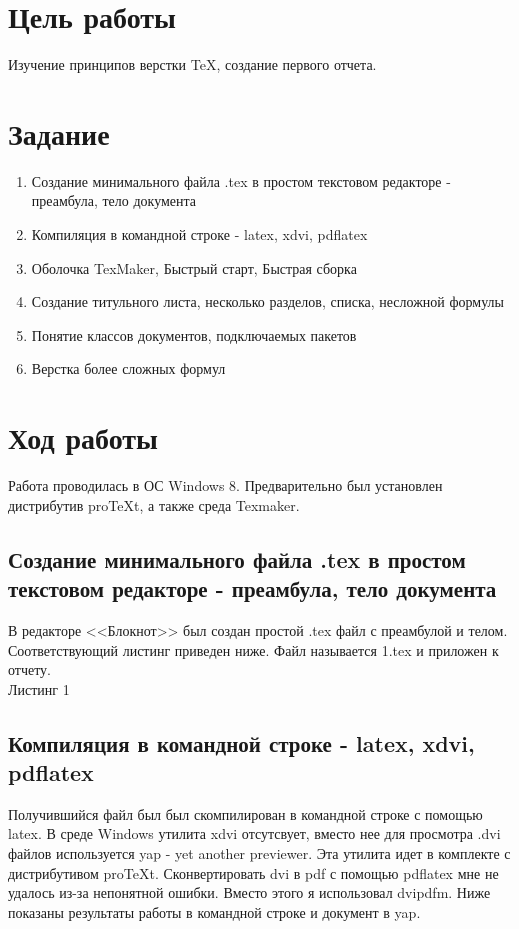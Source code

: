 \documentclass[10pt,a4paper,titlepage]{article}
\begin{document}
\section{Цель работы}
Изучение принципов верстки \TeX, создание первого отчета.

\section{Задание}
\begin{enumerate}
\item Создание минимального файла .tex в простом текстовом редакторе - преамбула, тело документа
\item Компиляция в командной строке - latex, xdvi, pdflatex
\item Оболочка TexMaker, Быстрый старт, Быстрая сборка
\item Создание титульного листа, несколько разделов, списка, несложной формулы
\item Понятие классов документов, подключаемых пакетов
\item Верстка более сложных формул
\end{enumerate}

\section{Ход работы}
Работа проводилась в ОС Windows 8. Предварительно был установлен дистрибутив proTeXt, а также среда Texmaker.
\subsection{Создание минимального файла .tex в простом текстовом редакторе - преамбула, тело документа}
В редакторе <<Блокнот>> был создан простой .tex файл с преамбулой и телом. Соответствующий листинг приведен ниже. Файл называется  1.tex и приложен к отчету.\\
\newline
Листинг 1\\
\fbox{}
\subsection{Компиляция в командной строке - latex, xdvi, pdflatex}
Получившийся файл был был скомпилирован в командной строке с помощью latex. В среде Windows утилита xdvi отсутсвует, вместо нее для просмотра .dvi файлов используется yap - yet another previewer. Эта утилита идет в комплекте с дистрибутивом proTeXt. Сконвертировать dvi в pdf с помощью pdflatex мне не удалось из-за непонятной ошибки. Вместо этого я использовал dvipdfm. Ниже показаны результаты работы в командной строке и документ в yap.\\
\newline
\end{document}
